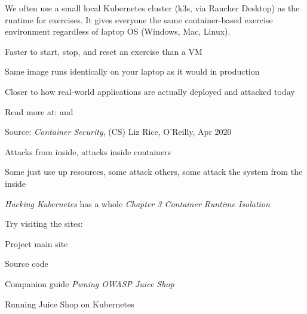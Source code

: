 \documentclass[Screen16to9,17pt]{foils}
\begin{document}
We often use a small local Kubernetes cluster (k3s, via Rancher Desktop) as the runtime for exercises. It gives everyone the same container-based exercise environment regardless of laptop OS (Windows, Mac, Linux).

\begin{list2}
  \item Faster to start, stop, and reset an exercise than a VM
  \item Same image runs identically on your laptop as it would in production
  \item Closer to how real-world applications are actually deployed and attacked today
\end{list2}

Read more at:  and 



Source: \emph{Container Security}, (CS) Liz Rice, O'Reilly, Apr 2020

\begin{list2}
\item Attacks from inside, attacks inside containers
\item Some just use up resources, some attack others, some attack the system from the inside
\item \emph{Hacking Kubernetes} has a whole \emph{Chapter 3 Container Runtime Isolation}
\end{list2}




Try visiting the sites:
\begin{list2}
\item Project main site 
\item Source code 
\item Companion guide \emph{Pwning OWASP Juice Shop} 
\item Running Juice Shop on Kubernetes 
\end{list2}
\end{document}
